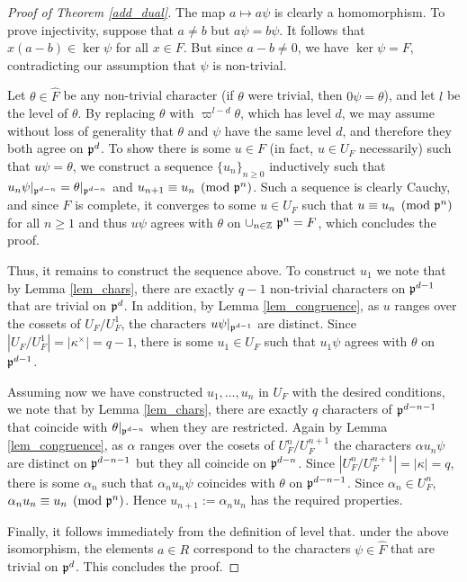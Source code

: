 \begin{proof}[Proof of Theorem \ref{add_dual}]
    The map $a\mapsto a\psi$ is clearly a homomorphism. To prove injectivity, suppose that $a\neq b$ but $a\psi=b\psi$. It follows that $x(a-b)\in\ker\psi$ for all $x\in F$. But since $a-b\neq 0$, we have $\ker\psi=F$, contradicting our assumption that $\psi$ is non-trivial.

    Let $\theta\in\hat{F}$ be any non-trivial character (if $\theta$ were trivial, then $0\psi=\theta$), and let $l$ be the level of $\theta$. By replacing $\theta$ with $\varpi^{l-d}\theta$, which has level $d$, we may assume without loss of generality that $\theta$ and $\psi$ have the same level $d$, and therefore they both agree on $\mathfrak{p}^d$. To show there is some $u\in F$ (in fact, $u\in U_F$ necessarily) such that $u\psi=\theta$,   we construct a sequence $\{u_n\}_{n\geq0}$ inductively such that $u_n\psi|_{\mathfrak{p}^{d-n}}=\theta|_{\mathfrak{p}^{d-n}}$ and $u_{n+1}\equiv u_n\pmod{\mathfrak{p}^n}$. Such a sequence is clearly Cauchy, and since $F$ is complete, it converges to some $u\in U_F$ such that $u\equiv u_n\pmod{\mathfrak{p}^n}$ for all $n\geq 1$ and thus $u\psi$ agrees with $\theta$ on $\cup_{n\in\mathbb{Z}}\ \mathfrak{p}^n=F$, which concludes the proof.

    Thus, it remains to construct the sequence above. To construct $u_1$ we note that by Lemma \ref{lem_chars}, there are exactly $q-1$ non-trivial characters on $\mathfrak{p}^{d-1}$ that are trivial on $\mathfrak{p}^d$. In addition, by Lemma \ref{lem_congruence}, as $u$ ranges over the cossets of $U_F/U_F^1$, the characters $u\psi|_{\mathfrak{p}^{d-1}}$ are distinct. Since $|U_F/U_F^1|=|\kappa^{\times}|=q-1$, there is some $u_1\in U_F$ such that $u_1\psi$ agrees with $\theta$ on $\mathfrak{p}^{d-1}$. 
    
    Assuming now we have constructed $u_1,\ldots,u_n$ in $U_F$ with the desired conditions, we note that by Lemma \ref*{lem_chars}, there are exactly $q$ characters of $\mathfrak{p}^{d-n-1}$ that coincide with $\theta|_{\mathfrak{p}^{d-n}}$ when they are restricted. Again by Lemma \ref*{lem_congruence}, as $\alpha$ ranges over the cosets of $U_F^n/U_F^{n+1}$ the characters $\alpha u_n\psi$ are distinct on $\mathfrak{p}^{d-n-1}$ but they all coincide on $\mathfrak{p}^{d-n}$. Since $|U_F^n/U_F^{n+1}|=|\kappa|=q$, there is some $\alpha_n$ such that $\alpha_n u_n\psi$ coincides with $\theta$ on $\mathfrak{p}^{d-n-1}$. Since $\alpha_n\in U_F^n$, $\alpha_n u_n\equiv u_n\pmod{\mathfrak{p}^n}$. Hence $u_{n+1}:=\alpha_n u_n$ has the required properties.

    Finally, it follows immediately from the definition of level that. under the above isomorphism, the elements $a\in R$ correspond to the characters $\psi\in\hat{F}$ that are trivial on $\mathfrak{p}^d$. This concludes the proof.
\end{proof}